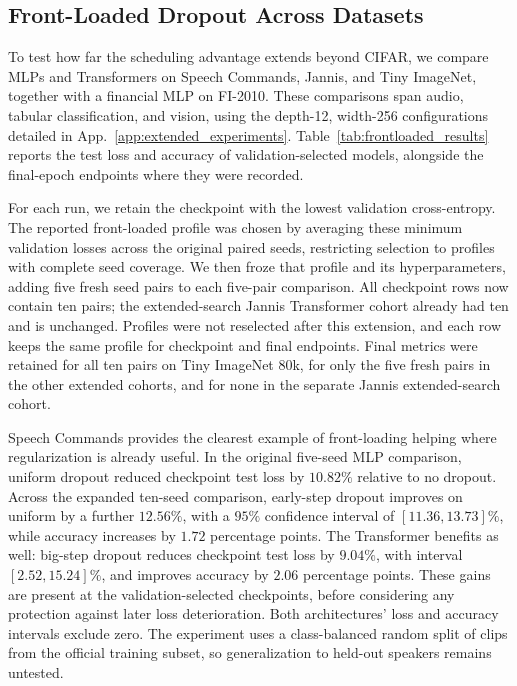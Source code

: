 \subsection{Front-Loaded Dropout Across Datasets}
\label{sec:extended_benchmarks}

To test how far the scheduling advantage extends beyond CIFAR, we compare MLPs and Transformers on Speech Commands, Jannis, and Tiny ImageNet, together with a financial MLP on FI-2010. These comparisons span audio, tabular classification, and vision, using the depth-12, width-256 configurations detailed in App.~\ref{app:extended_experiments}. Table~\ref{tab:frontloaded_results} reports the test loss and accuracy of validation-selected models, alongside the final-epoch endpoints where they were recorded.

For each run, we retain the checkpoint with the lowest validation cross-entropy. The reported front-loaded profile was chosen by averaging these minimum validation losses across the original paired seeds, restricting selection to profiles with complete seed coverage. We then froze that profile and its hyperparameters, adding five fresh seed pairs to each five-pair comparison. All checkpoint rows now contain ten pairs; the extended-search Jannis Transformer cohort already had ten and is unchanged. Profiles were not reselected after this extension, and each row keeps the same profile for checkpoint and final endpoints. Final metrics were retained for all ten pairs on Tiny ImageNet 80k, for only the five fresh pairs in the other extended cohorts, and for none in the separate Jannis extended-search cohort.

Speech Commands provides the clearest example of front-loading helping where regularization is already useful. In the original five-seed MLP comparison, uniform dropout reduced checkpoint test loss by $10.82\%$ relative to no dropout. Across the expanded ten-seed comparison, early-step dropout improves on uniform by a further $12.56\%$, with a $95\%$ confidence interval of $[11.36,13.73]\%$, while accuracy increases by $1.72$ percentage points. The Transformer benefits as well: big-step dropout reduces checkpoint test loss by $9.04\%$, with interval $[2.52,15.24]\%$, and improves accuracy by $2.06$ percentage points. These gains are present at the validation-selected checkpoints, before considering any protection against later loss deterioration. Both architectures' loss and accuracy intervals exclude zero. The experiment uses a class-balanced random split of clips from the official training subset, so generalization to held-out speakers remains untested.

